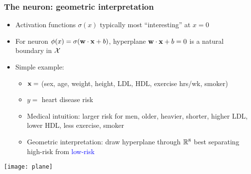 \begin{frame}
    \frametitle{The neuron: geometric interpretation}

    \begin{itemize}
        \item Activation functions $\sigma(x)$ typically most ``interesting'' at $x = 0$
        \item For neuron $\phi(x) = \sigma(\mathbf{w} \cdot \mathbf{x} + b)$, \textcolor{Green4}{hyperplane} $\mathbf{w} \cdot \mathbf{x} + b = 0$ is a natural boundary in $\mathcal{X}$
        \item Simple example:
        \begin{itemize}
            \item $\mathbf{x} =$ (sex, age, weight, height, LDL, HDL, exercise hrs/wk, smoker)
            \item $y =$ heart disease risk
            \item Medical intuition: larger risk for men, older, heavier, shorter, higher LDL, lower HDL, less exercise, smoker
            \item Geometric interpretation: draw \textcolor{Green4}{hyperplane} through $\mathbb{R}^8$ best separating \alert{high-risk} from \textcolor{blue}{low-risk}
        \end{itemize}
    \end{itemize}

    \centering
    \texttt{[image: plane]}
\end{frame}

